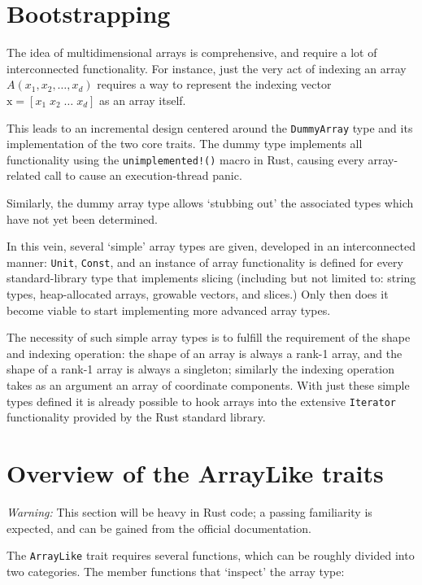 \documentclass{DIKU-report-variant}
\newcommand\mrm[1]{\mathrm{#1}}
\newcommand\brm[1]{\bm{\mrm{#1}}}
\begin{document}
\section{Bootstrapping}

The idea of multidimensional arrays is comprehensive, and require a lot of interconnected functionality.
For instance, just the very act of indexing an array \(A(x_1, x_2, \dots, x_d)\) requires a way to represent
the indexing vector \(\brm x = [x_1\; x_2\; \dots\;x_d]\) as an array itself.

This leads to an incremental design centered around the \texttt{DummyArray} type and its implementation of
the two core traits. The dummy type implements all functionality using the \texttt{unimplemented!()} macro
in Rust, causing every array-related call to cause an execution-thread panic.

Similarly, the dummy array type allows `stubbing out' the associated types which have not yet been determined.

In this vein, several `simple' array types are given, developed in an interconnected manner: \texttt{Unit},
\texttt{Const}, and an instance of array functionality is defined for every standard-library type that implements slicing
(including but not limited to: string types, heap-allocated arrays, growable vectors, and slices.) Only then does
it become viable to start implementing more advanced array types.

The necessity of such simple array types is to fulfill the requirement of the shape and indexing operation: the
shape of an array is always a rank-1 array, and the shape of a rank-1 array is always a singleton; similarly
the indexing operation takes as an argument an array of coordinate components. With just these simple types defined
it is already possible to hook arrays into the extensive \texttt{Iterator} functionality provided by the Rust
standard library.

\section{Overview of the ArrayLike traits}

\textit{Warning:} This section will be heavy in Rust code; a passing familiarity is expected, and can
be gained from the official documentation\cite{RDOC117}.

The \texttt{ArrayLike} trait requires several functions, which can be roughly divided into two categories.
The member functions that `inspect' the array type:
\end{document}

